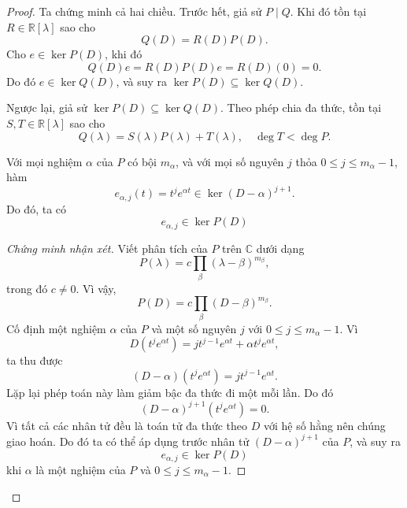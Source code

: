 ﻿\documentclass[12pt]{article}
\begin{document}
\begin{proof}
Ta chứng minh cả hai chiều.
Trước hết, giả sử $P \mid Q$. Khi đó tồn tại $R \in \mathbb R[\lambda]$ sao cho
\[
 Q(D) = R(D)P(D).
\]
Cho $e \in \ker P(D)$, khi đó
\[
 Q(D)e
 =
 R(D)P(D)e
 =
 R(D)(0)
 =
 0.
\]
Do đó $e \in \ker Q(D)$, và suy ra $\ker P(D) \subseteq \ker Q(D)$.

Ngược lại, giả sử $\ker P(D) \subseteq \ker Q(D)$. Theo phép chia đa thức, tồn tại $S, T \in \mathbb R[\lambda]$ sao cho
\begin{equation}\label{divi1}
 Q(\lambda) = S(\lambda)P(\lambda) + T(\lambda),
 \quad
 \deg T < \deg P.
\end{equation}


\begin{claim}\label{claim1}
Với mọi nghiệm $\alpha$ của $P$ có bội $m_\alpha$, và với mọi số nguyên $j$ thỏa $0\le j\le m_\alpha - 1$, hàm
\[
 e_{\alpha, j}(t) = t^j e^{\alpha t} \in \ker(D - \alpha)^{j + 1}.
\]
Do đó, ta có
\[
 e_{\alpha, j} \in \ker P(D)
\]
\end{claim}

\begin{proof}[Chứng minh nhận xét]
Viết phân tích của $P$ trên $\mathbb C$ dưới dạng
\[
 P(\lambda) = c\prod_{\beta}(\lambda - \beta)^{m_\beta},
\]
trong đó $c \neq 0$. Vì vậy,
\[
 P(D) = c\prod_{\beta}(D - \beta)^{m_\beta}.
\]
Cố định một nghiệm $\alpha$ của $P$ và một số nguyên $j$ với $0\le j\le m_\alpha - 1$.
Vì
\[
 D(t^j e^{\alpha t})
 =
 jt^{j - 1}e^{\alpha t} + \alpha t^j e^{\alpha t},
\]
ta thu được
\[
 (D - \alpha)(t^j e^{\alpha t})
 =
 jt^{j - 1}e^{\alpha t}.
\]
Lặp lại phép toán này làm giảm bậc đa thức đi một mỗi lần. Do đó
\[
 (D - \alpha)^{j + 1}(t^j e^{\alpha t}) = 0.
\]
Vì tất cả các nhân tử đều là toán tử đa thức theo $D$ với hệ số hằng nên chúng giao hoán. Do đó ta có thể áp dụng trước nhân tử $(D - \alpha)^{j + 1}$ của $P$, và suy ra
\[
 e_{\alpha, j} \in \ker P(D)
\]
khi $\alpha$ là một nghiệm của $P$ và $0 \leq j \leq m_\alpha - 1$.
\end{proof}


\end{proof}
\end{document}
